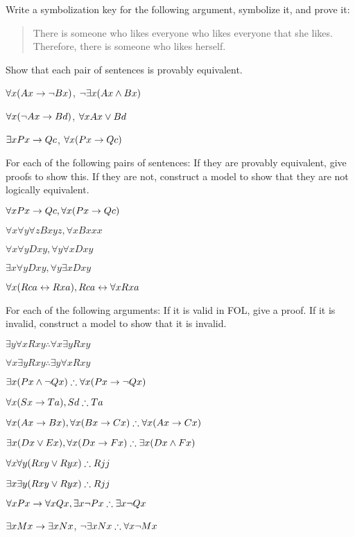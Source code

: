 \begin{practiceproblems}
\solutions
\problempart
\label{pr.likes}
Write a symbolization key for the following argument, symbolize it, and prove it:
\begin{quote}
There is someone who likes everyone who likes everyone that she likes. Therefore, there is someone who likes herself.
\end{quote}


\problempart
Show that each pair of sentences is provably equivalent.
\begin{earg}
\item $\forall x (Ax\rightarrow \neg Bx)$, $\neg\exists x(Ax \mathbin{\wedge} Bx)$
\item $\forall x (\neg Ax\rightarrow Bd)$, $\forall x Ax \vee Bd$
\item $\exists x Px \rightarrow Qc$, $\forall x (Px \rightarrow Qc)$
\end{earg}

\solutions
\problempart
\label{pr.FOLequivornot}
For each of the following pairs of sentences: If they are provably equivalent, give proofs to show this. If they are not, construct a model to show that they are not logically equivalent.
\begin{earg}
\item $\forall x Px \rightarrow Qc, \forall x (Px \rightarrow Qc)$
\item $\forall x\forall y \forall z Bxyz, \forall x Bxxx$
\item $\forall x\forall y Dxy, \forall y\forall x Dxy$
\item $\exists x\forall y Dxy, \forall y\exists x Dxy$
\item $\forall x (Rca \leftrightarrow Rxa), Rca \leftrightarrow \forall x Rxa$
\end{earg}

\solutions
\problempart
\label{pr.FOLvalidornot}
For each of the following arguments: If it is valid in FOL, give a proof. If it is invalid, construct a model to show that it is invalid.
\begin{earg}
\item $\exists y\forall x Rxy \therefore \forall x\exists y Rxy$
\item $\forall x\exists y Rxy \therefore  \exists y\forall x Rxy$
\item $\exists x(Px \eand \enot Qx) \therefore \forall x(Px \eif \enot Qx)$
\item $\forall x(Sx \eif Ta), Sd \therefore Ta$
\item $\forall x(Ax\eif Bx), \forall x(Bx \eif Cx) \therefore \forall x(Ax \eif Cx)$
\item $\exists x(Dx \eor Ex), \forall x(Dx \eif Fx) \therefore \exists x(Dx \eand Fx)$
\item $\forall x\forall y(Rxy \eor Ryx) \therefore Rjj$
\item $\exists x\exists y(Rxy \eor Ryx) \therefore Rjj$
\item $\forall x Px \eif \forall x Qx, \exists x \enot Px \therefore \exists x \enot Qx$
\item $\exists x Mx \rightarrow \exists x Nx$, $\enot \exists x Nx\therefore  \forall x \enot Mx$
\end{earg}

\end{practiceproblems}


